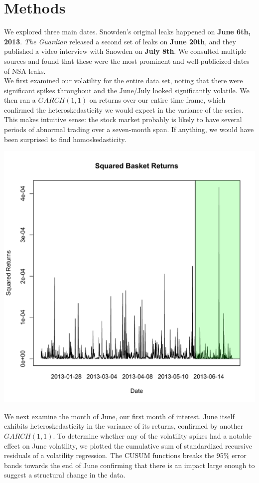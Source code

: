 \documentclass[11pt]{amsart}
\begin{document}
\section{Methods}
We explored three main dates. Snowden's original leaks happened on \textbf{June 6th, 2013}. \textit{The Guardian} released a second set of leaks on \textbf{June 20th}, and they published a video interview with Snowden on \textbf{July 8th}. We consulted multiple sources and found that these were the most prominent and well-publicized dates of NSA leaks.  \\

We first examined our volatility for the entire data set, noting that there were significant spikes throughout and the June/July looked significantly volatile. We then ran a $GARCH(1,1)$ on returns over our entire time frame, which confirmed the heteroskedasticity we would expect in the variance of the series. This makes intuitive sense: the stock market probably is likely to have several periods of abnormal trading over a seven-month span. If anything, we would have been surprised to find homoskedasticity. \\

\newpage

\centerline{\includegraphics[scale=0.5]{basket_sq_returns_12_08.pdf}}

We next examine the month of June, our first month of interest. June itself exhibits heteroskedasticity in the variance of its returns, confirmed by another $GARCH(1,1)$.  To determine whether any of the volatility spikes had a notable effect on June volatility, we plotted the cumulative sum of standardized recursive residuals of a volatility regression. The CUSUM functions breaks the 95\% error bands towards the end of June confirming that there is an impact large enough to suggest a structural change in the data.\\
\end{document}
